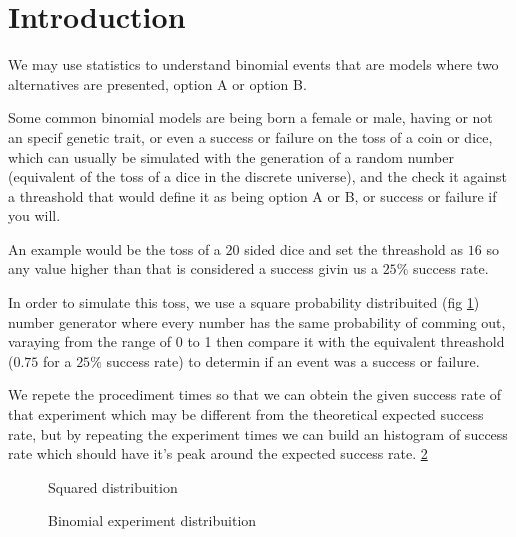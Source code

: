 \section{Introduction}

We may use statistics to understand binomial events that are models where
two alternatives are presented, option A or option B.

Some common binomial models are being born a female or male, having or not an specif genetic trait,
or even a success or failure on the toss of a coin or dice, which can usually
be simulated with the generation of a random number (equivalent of the toss of a dice in the discrete universe),
and the check it against a threashold that would define it as being
option A or B, or success or failure if you will.

An example would be the toss of a $20$ sided dice and set the threashold as $16$ so any value higher
than that is considered a success givin us a $25\%$ success rate.

In order to simulate this toss, we use a square probability distribuited (fig \ref{intro:squared}) number generator
where every number has the same probability of comming out, varaying from the range of 0 to 1
then compare it with the equivalent threashold ($0.75$ for a $25\%$ success rate) to determin if an event was
a success or failure.

We repete the procediment \introexperimentsize{} times so that we can obtein the given success rate of that experiment
which may be different from the theoretical expected success rate, but by repeating the experiment
\introexperimentrepeats{} times we can build an histogram of success rate which should have it's peak around the
expected success rate.
\ref{intro:binomial}

\begin{center}
\begin{figure}[H]
\begin{center}
\caption{Squared distribuition}
\label{intro:squared}
\end{center}
\end{figure}
\end{center}

\begin{center}
\begin{figure}[H]
\begin{center}
\caption{Binomial experiment distribuition}
\label{intro:binomial}
\end{center}
\end{figure}
\end{center}
